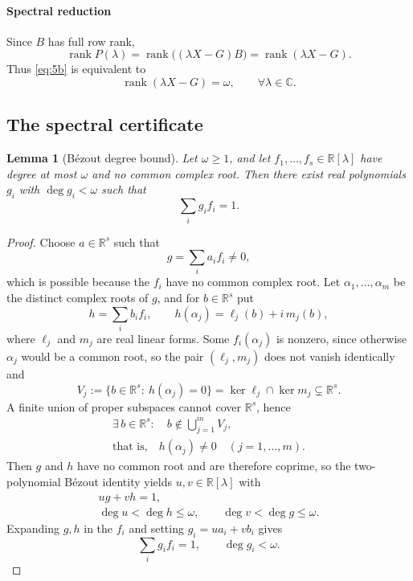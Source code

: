 \documentclass[journal]{IEEEtran}
\theoremstyle{plainn}
\newtheorem{lem}[thm]{Lemma}
\theoremstyle{remark}
\begin{document}
\paragraph*{Spectral reduction}\label{sec:spectral}
Since $B$ has full row rank,
\[
\operatorname{rank}P(\lambda)
=\operatorname{rank}\bigl((\lambda X-G)B\bigr)
=\operatorname{rank}(\lambda X-G).
\]
Thus \eqref{eq:5b} is equivalent to
\[
\operatorname{rank}(\lambda X-G)=\omega,\qquad\forall\lambda\in\mathbb C .
\]

\subsection{The spectral certificate}\label{sec:spectrum}

\begin{lem}[B\'ezout degree bound]\label{lem:bezout}\label{sec:bezout}
	Let $\omega\ge1$, and let $f_1,\ldots,f_s\in\mathbb R[\lambda]$ have
	degree at most $\omega$ and no common complex root. Then there exist
	real polynomials $g_i$ with $\deg g_i<\omega$ such that
	\[
	\sum_i g_i f_i=1 .
	\]
\end{lem}

\begin{proof}
	Choose $a\in\mathbb R^s$ such that
	\[
	g=\sum_i a_if_i\neq0,
	\]
	which is possible because the $f_i$ have no common complex root. Let
	$\alpha_1,\dots,\alpha_m$ be the distinct complex roots of $g$, and for
	$b\in\mathbb R^s$ put
	\[
	h=\sum_i b_if_i,\qquad
	h(\alpha_j)=\ell_j(b)+i\,m_j(b),
	\]
	where $\ell_j$ and $m_j$ are real linear forms. Some $f_i(\alpha_j)$ is
	nonzero, since otherwise $\alpha_j$ would be a common root, so the pair
	$(\ell_j,m_j)$ does not vanish identically and
	\[
	V_j:=\{b\in\mathbb R^s:\ h(\alpha_j)=0\}
	=\ker\ell_j\cap\ker m_j\subsetneq\mathbb R^s .
	\]
	A finite union of proper subspaces cannot cover $\mathbb R^s$, hence
	\[
	\begin{gathered}
	\exists\,b\in\mathbb R^s:\quad b\notin\bigcup_{j=1}^{m}V_j,\\
	\text{that is,}\quad h(\alpha_j)\neq0\quad (j=1,\dots,m).
	\end{gathered}
	\]
	Then $g$ and $h$ have no common root and are therefore coprime, so the
	two-polynomial B\'ezout identity yields $u,v\in\mathbb R[\lambda]$ with
	\[
	\begin{gathered}
	ug+vh=1,\\
	\deg u<\deg h\le\omega,\qquad \deg v<\deg g\le\omega .
	\end{gathered}
	\]
	Expanding $g,h$ in the $f_i$ and setting $g_i=ua_i+vb_i$ gives
	\[
	\sum_i g_i f_i=1,\qquad \deg g_i<\omega .
	\]
\end{proof}
\end{document}
